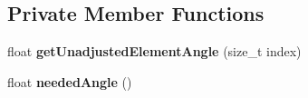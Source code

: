\subsection*{Private Member Functions}
\begin{DoxyCompactItemize}
\item 
\hypertarget{classGUICircleArrangement_ade47f635adeff2c95ebd80630a211b71}{float {\bfseries get\+Unadjusted\+Element\+Angle} (size\+\_\+t index)}\label{classGUICircleArrangement_ade47f635adeff2c95ebd80630a211b71}

\item 
\hypertarget{classGUICircleArrangement_af6dcc35efd4028c3b006cc568b49966a}{float {\bfseries needed\+Angle} ()}\label{classGUICircleArrangement_af6dcc35efd4028c3b006cc568b49966a}

\end{DoxyCompactItemize}
